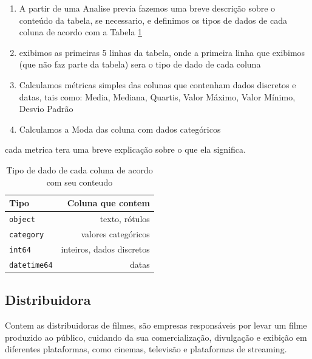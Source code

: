 \documentclass[12pt, a4paper]{article}
\begin{document}
\begin{enumerate}
    \item A partir de uma Analise previa fazemos uma breve descrição sobre o conteúdo da tabela, se necessario, e definimos os tipos de dados de cada coluna de acordo com a Tabela \ref{tab:tipos_dados}
    \item exibimos as primeiras 5 linhas da tabela, onde a primeira linha que exibimos (que não faz parte da tabela) sera o tipo de dado de cada coluna
    \item Calculamos métricas simples das colunas que contenham dados discretos e datas, tais como: Media, Mediana, Quartis, Valor Máximo, Valor Mínimo, Desvio Padrão
    \item  Calculamos a Moda das coluna com dados categóricos
\end{enumerate}

cada metrica tera uma breve explicação sobre o que ela significa.

\begin{table}[h]
    \centering
    \begin{tabular}{l|r}
        Tipo & Coluna que contem\\
        \hline
        \texttt{object} & texto, rótulos\\
        \texttt{category} & valores categóricos\\
        \texttt{int64} & inteiros, dados discretos\\
        \texttt{datetime64} & datas\\
    \end{tabular}
    \caption{Tipo de dado de cada coluna de acordo com seu conteudo}
    \label{tab:tipos_dados}
\end{table}

\subsection{Distribuidora}

Contem as distribuidoras de filmes, são empresas responsáveis por levar um filme produzido ao público, cuidando da sua comercialização, divulgação e exibição em diferentes plataformas, como cinemas, televisão e plataformas de streaming.
\end{document}
